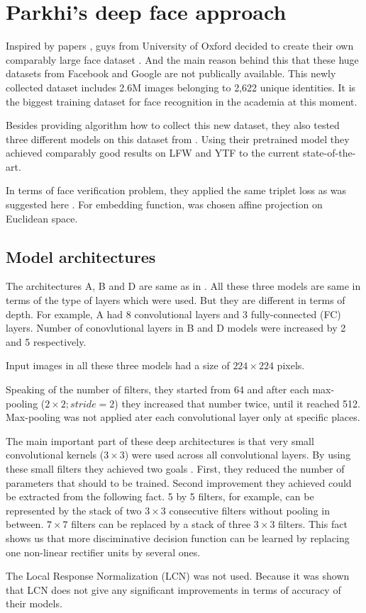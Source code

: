\documentclass[paper=a4, fontsize=11pt]{scrartcl} %
\numberwithin{equation}{section} %
\numberwithin{figure}{section} %
\numberwithin{table}{section} %
\begin{document}
\section{Parkhi's deep face approach}

Inspired by papers \cite{taigman2014deepface, schroff2015facenet}, guys from University of Oxford decided to create their own comparably large face dataset \cite{parkhi2015deep}. And the main reason behind this that these huge datasets from Facebook and Google are not publically available. This newly collected dataset includes 2.6M images belonging to 2,622 unique identities. It is the biggest training dataset for face recognition in the academia at this moment. \par
Besides providing algorithm how to collect this new dataset, they also tested three different models on this dataset from \cite{simonyan2014very}. Using their pretrained model they achieved comparably good results on LFW and YTF to the current state-of-the-art.\par
In terms of face verification problem, they applied the same triplet loss as was suggested here \cite{schroff2015facenet}. For embedding function, was chosen affine projection on Euclidean space.

\subsection{Model architectures}

The architectures A, B and D are same as in \cite{simonyan2014very}. All these three models are same in terms of the type of layers which were used. But they are different in terms of depth. For example, A had 8 convolutional layers and 3 fully-connected (FC) layers. Number of conovlutional layers in B and D models were increased by 2 and 5 respectively. \par 
Input images in all these three models had a size of $224\times224$ pixels. \par
Speaking of the number of filters, they started from 64 and after each max-pooling ($2\times2; stride = 2$) they increased that number twice, until it reached 512. Max-pooling was not applied ater each convolutional layer only at specific places. \par
The main important part of these deep architectures is that very small convolutional kernels ($3\times3$) were used across all convolutional layers. By using these small filters they achieved two goals \cite{simonyan2014very}. First, they reduced the number of parameters that should to be trained. Second improvement they achieved could be extracted from the following fact. 5 by 5 filters, for example, can be represented by the stack of two $3\times3$ consecutive filters without pooling in between. $7\times7$ filters can be replaced by a stack of three $3\times3$ filters. This fact shows us that more disciminative decision function can be learned by replacing one non-linear rectifier units by several ones. \par
The Local Response Normalization (LCN) \cite{krizhevsky2012imagenet} was not used. Because it was shown that LCN does not give any significant improvements in terms of accuracy of their models.
\end{document}
